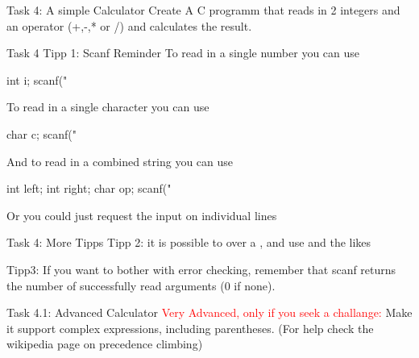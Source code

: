 \documentclass[10pt,graphics,aspectratio=169,table]{beamer}
\begin{document}
\begin{frame}[fragile]{Task 4: A simple Calculator}
Create A C programm that reads in 2 integers and an operator (+,-,* or /)
and calculates the result. 

\end{frame}

\begin{frame}[fragile]{Task 4 Tipp 1: Scanf Reminder}
To read in a single number you can use 
\begin{codeblock}
int i;
scanf("%
\end{codeblock}

To read in a single character you can use
\begin{codeblock}
    char c;
    scanf("%
\end{codeblock}

And to read in a combined string you can use
\begin{codeblock}
    int left;
    int right;
    char op;
    scanf("%
\end{codeblock}

Or you could just request the input on individual lines
\end{frame}

\begin{frame}[fragile]{Task 4: More Tipps}
Tipp 2:
it is possible to  over a ,
and use  and the likes 

Tipp3: If you want to bother with error checking, remember that scanf returns
the number of successfully read arguments (0 if none).
\end{frame}


\begin{frame}[fragile]{Task 4.1: Advanced Calculator}
\textcolor{red}{Very Advanced, only if you seek a challange:} 
Make it support complex expressions, including parentheses.
(For help check the wikipedia page on precedence climbing)
\end{frame}
\end{document}
